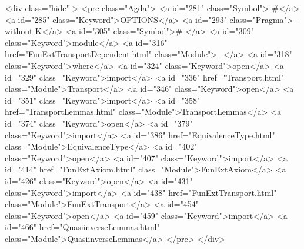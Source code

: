   <div class="hide" >
<pre class="Agda">
<a id="281" class="Symbol">{-#</a> <a id="285" class="Keyword">OPTIONS</a> <a id="293" class="Pragma">--without-K</a> <a id="305" class="Symbol">#-}</a>
<a id="309" class="Keyword">module</a> <a id="316" href="FunExtTransportDependent.html" class="Module">_</a> <a id="318" class="Keyword">where</a>
<a id="324" class="Keyword">open</a> <a id="329" class="Keyword">import</a> <a id="336" href="Transport.html" class="Module">Transport</a>
<a id="346" class="Keyword">open</a> <a id="351" class="Keyword">import</a> <a id="358" href="TransportLemmas.html" class="Module">TransportLemmas</a>
<a id="374" class="Keyword">open</a> <a id="379" class="Keyword">import</a> <a id="386" href="EquivalenceType.html" class="Module">EquivalenceType</a>
<a id="402" class="Keyword">open</a> <a id="407" class="Keyword">import</a> <a id="414" href="FunExtAxiom.html" class="Module">FunExtAxiom</a>
<a id="426" class="Keyword">open</a> <a id="431" class="Keyword">import</a> <a id="438" href="FunExtTransport.html" class="Module">FunExtTransport</a>
<a id="454" class="Keyword">open</a> <a id="459" class="Keyword">import</a> <a id="466" href="QuasiinverseLemmas.html" class="Module">QuasiinverseLemmas</a>
</pre>
</div>

